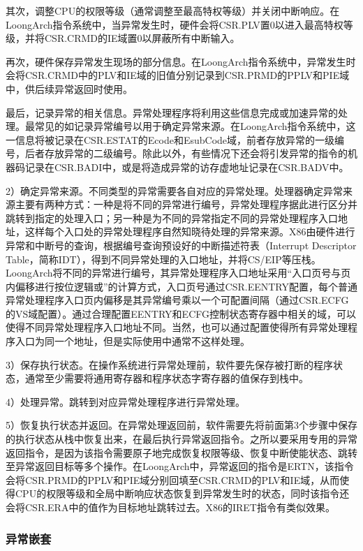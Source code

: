 \documentclass[]{ctexbook}
\begin{document}
其次，调整CPU的权限等级（通常调整至最高特权等级）并关闭中断响应。在LoongArch指令系统中，当异常发生时，硬件会将CSR.PLV置0以进入最高特权等级，并将CSR.CRMD的IE域置0以屏蔽所有中断输入。

再次，硬件保存异常发生现场的部分信息。在LoongArch指令系统中，异常发生时会将CSR.CRMD中的PLV和IE域的旧值分别记录到CSR.PRMD的PPLV和PIE域中，供后续异常返回时使用。

最后，记录异常的相关信息。异常处理程序将利用这些信息完成或加速异常的处理。最常见的如记录异常编号以用于确定异常来源。在LoongArch指令系统中，这一信息将被记录在CSR.ESTAT的Ecode和EsubCode域，前者存放异常的一级编号，后者存放异常的二级编号。除此以外，有些情况下还会将引发异常的指令的机器码记录在CSR.BADI中，或是将造成异常的访存虚地址记录在CSR.BADV中。

2）确定异常来源。不同类型的异常需要各自对应的异常处理。处理器确定异常来源主要有两种方式：一种是将不同的异常进行编号，异常处理程序据此进行区分并跳转到指定的处理入口；另一种是为不同的异常指定不同的异常处理程序入口地址，这样每个入口处的异常处理程序自然知晓待处理的异常来源。X86由硬件进行异常和中断号的查询，根据编号查询预设好的中断描述符表（Interrupt Descriptor Table，简称IDT），得到不同异常处理的入口地址，并将CS/EIP等压栈。LoongArch将不同的异常进行编号，其异常处理程序入口地址采用``入口页号与页内偏移进行按位逻辑或''的计算方式，入口页号通过CSR.EENTRY配置，每个普通异常处理程序入口页内偏移是其异常编号乘以一个可配置间隔（通过CSR.ECFG的VS域配置）。通过合理配置EENTRY和ECFG控制状态寄存器中相关的域，可以使得不同异常处理程序入口地址不同。当然，也可以通过配置使得所有异常处理程序入口为同一个地址，但是实际使用中通常不这样处理。

3）保存执行状态。在操作系统进行异常处理前，软件要先保存被打断的程序状态，通常至少需要将通用寄存器和程序状态字寄存器的值保存到栈中。

4）处理异常。跳转到对应异常处理程序进行异常处理。

5）恢复执行状态并返回。在异常处理返回前，软件需要先将前面第3个步骤中保存的执行状态从栈中恢复出来，在最后执行异常返回指令。之所以要采用专用的异常返回指令，是因为该指令需要原子地完成恢复权限等级、恢复中断使能状态、跳转至异常返回目标等多个操作。在LoongArch中，异常返回的指令是ERTN，该指令会将CSR.PRMD的PPLV和PIE域分别回填至CSR.CRMD的PLV和IE域，从而使得CPU的权限等级和全局中断响应状态恢复到异常发生时的状态，同时该指令还会将CSR.ERA中的值作为目标地址跳转过去。X86的IRET指令有类似效果。

\hypertarget{ux5f02ux5e38ux5d4cux5957}{%
\subsubsection{异常嵌套}\label{ux5f02ux5e38ux5d4cux5957}}
\end{document}
